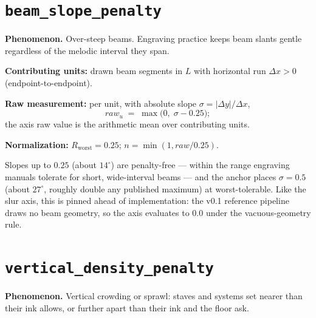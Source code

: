 \documentclass[11pt,letterpaper]{report}
\newcounter{requirement}[chapter]
\begin{document}
\section{\texttt{beam\_slope\_penalty}}
\label{sec:metrics:beam}

\textbf{Phenomenon.} Over-steep beams. Engraving practice keeps beam
slants gentle regardless of the melodic interval they span.

\begin{requirement}
\label{req:qmc:beam}
\textbf{Contributing units:} drawn beam segments in $L$ with horizontal
run $\Delta x > 0$ (endpoint-to-endpoint).

\textbf{Raw measurement:} per unit, with absolute slope
$\sigma = |\Delta y| / \Delta x$,
\[
  \mathit{raw}_u \;=\; \max\bigl(0,\; \sigma - 0.25\bigr);
\]
the axis raw value is the arithmetic mean over contributing units.

\textbf{Normalization:} $R_{\mathrm{worst}} = 0.25$;
$n = \min(1, \mathit{raw} / 0.25)$.
\end{requirement}

\begin{rationale}
Slopes up to $0.25$ (about $14^\circ$) are penalty-free --- within the
range engraving manuals tolerate for short, wide-interval beams --- and the
anchor places $\sigma = 0.5$ (about $27^\circ$, roughly double any
published maximum) at worst-tolerable. Like the slur axis, this is pinned
ahead of implementation: the v0.1 reference pipeline draws no beam
geometry, so the axis evaluates to $0.0$ under the vacuous-geometry rule.
\end{rationale}

\section{\texttt{vertical\_density\_penalty}}
\label{sec:metrics:vertical}

\textbf{Phenomenon.} Vertical crowding or sprawl: staves and systems set
nearer than their ink allows, or further apart than their ink and the floor
ask.
\end{document}

